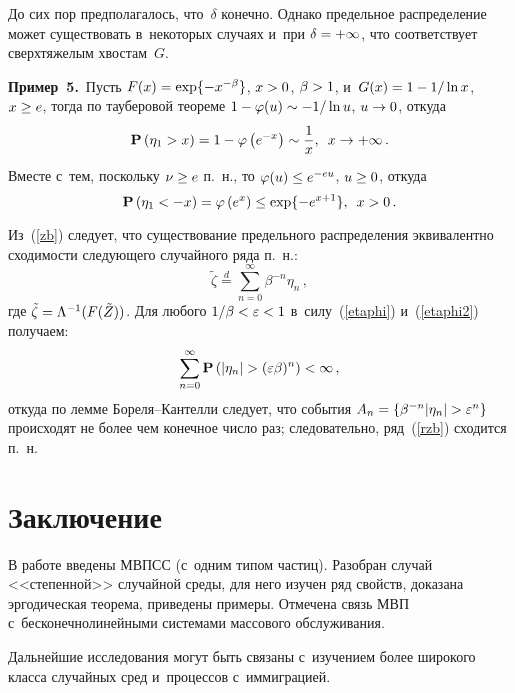 \begin{multicols}{2}
\smallskip

До сих пор предполагалось, что~$\delta$ конечно. Однако предельное распределение
может существовать в~некоторых случаях и~при $\delta\hm=+\infty$, что соответствует
сверх\-тя\-же\-лым хвос\-там~$G$.

\smallskip

\noindent
\textbf{Пример~5.}\ Пусть $F(x)\hm=\exp\{-x^{-\beta}\}$, $x\hm>0$, $\beta\hm>1$, 
и~$G(x)\hm=1-\hm1/\ln x$, $x\hm\ge e$,
тогда по тауберовой тео\-ре\-ме $1\hm-\varphi(u)\hm\sim -1/\ln u$, $u\hm\to 0$, откуда
\begin{equation}
\label{etaphi}
{\bf P}\left(\eta_1>x\right)=1-\varphi\left(e^{-x}\right)\sim \displaystyle\frac{\displaystyle 1\mathstrut}{\displaystyle x\mathstrut},\enskip 
x\to+\infty\,.
\end{equation}
Вместе с~тем, поскольку $\nu\hm\ge e$ п.~н., то $\varphi(u)\hm\le e^{-eu}$, 
$u\hm\ge 0$, откуда
\begin{equation}
\label{etaphi2}
{\bf P}\left(\eta_1<-x\right)=\varphi\left(e^x\right)\le \exp\{-e^{x+1}\},\enskip x>0\,.
\end{equation}

Из~(\ref{zb}) следует, что существование предельного распределения эквивалентно 
схо\-ди\-мости
сле\-ду\-юще\-го случайного ряда п.~н.:
\begin{equation}
\label{rzb}
{\tilde\zeta}\stackrel{d}{=}\sum\limits_{n=0}^\infty\beta^{-n}\eta_n\,,
\end{equation}
где ${\tilde\zeta}\hm=\Lambda^{-1}(F({\tilde Z}))$.
Для любого $1/\beta\hm<\varepsilon\hm<1$ в~силу~(\ref{etaphi}) и~(\ref{etaphi2}) 
получаем:
$$
\sum\limits_{n=0}^\infty {\bf P}\left(\left\vert \eta_n\right\vert 
>(\varepsilon\beta)^n\right)<\infty\,,
$$
откуда по лемме Бо\-ре\-ля--Кан\-тел\-ли следует, что события
$A_n\hm=\{\beta^{-n}|\eta_n|\hm>\varepsilon^n\}$ происходят не 
более чем конечное чис\-ло раз;
следовательно, ряд~(\ref{rzb}) сходится п.~н.

\section{Заключение}

В работе введены МВПСС (с~одним
типом час\-тиц). Разобран случай <<степенной>> случайной среды, для него изучен ряд свойств,
доказана эргодическая тео\-ре\-ма, приведены примеры. Отмечена связь 
МВП с~бесконечнолинейными сис\-те\-ма\-ми массового обслуживания.

Дальнейшие исследования могут быть связаны с~изуче\-ни\-ем более широкого класса
случайных сред и~процессов с~иммиграцией.


\end{multicols}
